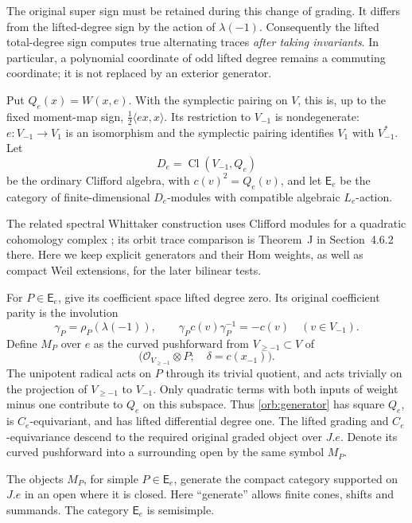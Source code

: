 The original super sign must be retained during this change of
grading.  It differs from the lifted-degree sign by the action of
$\lambda(-1)$.  Consequently the lifted total-degree sign computes
true alternating traces \emph{after taking invariants}.  In
particular, a polynomial coordinate of odd lifted degree remains a
commuting coordinate; it is not replaced by an exterior generator.

Put $Q_e(x)=W(x,e)$.  With the symplectic pairing on $V$, this is, up
to the fixed moment-map sign, $\frac12\langle ex,x\rangle$.
Its restriction to $V_{-1}$ is nondegenerate: $e:V_{-1}\to V_1$ is an
isomorphism and the symplectic pairing identifies $V_1$ with
$V_{-1}^*$.  Let
\[
 D_e=\operatorname{Cl}(V_{-1},Q_e)
\]
be the ordinary Clifford algebra, with $c(v)^2=Q_e(v)$, and let
$\mathsf E_e$ be the category of finite-dimensional $D_e$-modules with
compatible algebraic $L_e$-action.

The related spectral Whittaker construction uses Clifford modules for a
quadratic cohomology complex \cite[Sections~4.5.2--4.5.5]{Raskin};
its orbit trace comparison is Theorem~J in Section~4.6.2 there.
Here we keep explicit generators and their Hom weights, as well as
compact Weil extensions, for the later bilinear tests.

For $P\in\mathsf E_e$, give its coefficient space lifted degree zero.
Its original coefficient parity is the involution
\begin{equation}\label{orb:parity}
 \gamma_P=\rho_P(\lambda(-1)),\qquad
 \gamma_Pc(v)\gamma_P^{-1}=-c(v)\quad(v\in V_{-1}).
\end{equation}
Define $M_P$ over $e$ as the curved pushforward from
$V_{\ge-1}\subset V$ of
\begin{equation}\label{orb:generator}
 \bigl(\mathcal O_{V_{\ge-1}}\otimes P;\quad
                  \delta=c(x_{-1})\bigr).
\end{equation}
The unipotent radical acts on $P$ through its trivial quotient, and
acts trivially on the projection of $V_{\ge-1}$ to $V_{-1}$.
Only quadratic terms with both inputs of weight minus one contribute
to $Q_e$ on this subspace.  Thus \eqref{orb:generator} has square $Q_e$, is
$C_e$-equivariant, and has lifted differential degree one.
The lifted grading and $C_e$-equivariance descend to the required
original graded object over $J.e$.  Denote its curved pushforward into
a surrounding open by the same symbol $M_P$.

\begin{proposition}\label{orb:generation}
The objects $M_P$, for simple $P\in\mathsf E_e$, generate the compact
category supported on $J.e$ in an open where it is closed.  Here
``generate'' allows finite cones, shifts and summands.
The category $\mathsf E_e$ is semisimple.
\end{proposition}

